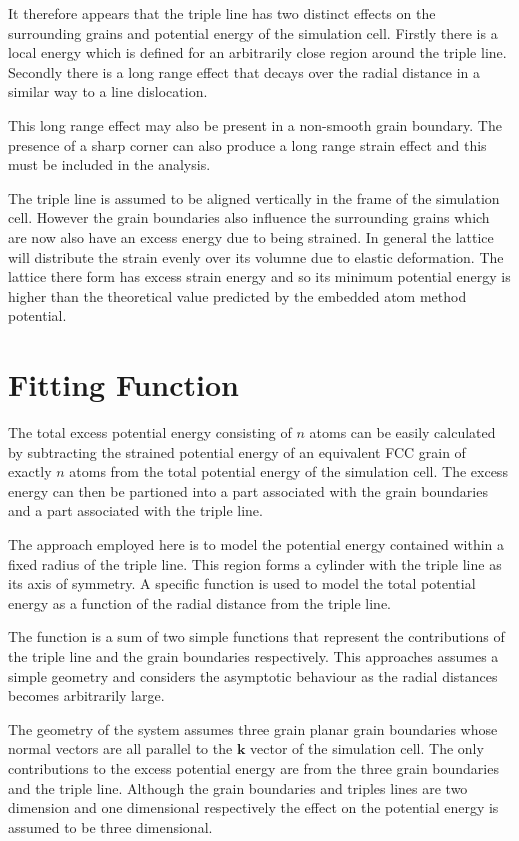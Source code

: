 \documentclass[12pt,a4paper]{book}
\begin{document}
It therefore appears that the triple line has two distinct effects on the surrounding grains and potential energy of the simulation cell. Firstly there is a local energy which is defined for an arbitrarily close region around the triple line. Secondly there is a long range effect that decays over the radial distance in a similar way to a line dislocation.

This long range effect may also be present in a non-smooth grain boundary. The presence of a sharp corner can also produce a long range strain effect and this must be included in the analysis.

The triple line is assumed to be aligned vertically in the frame of the simulation cell. However the grain boundaries also influence the surrounding grains which are now also have an excess energy due to being strained. In general the lattice will distribute the strain evenly over its volumne due to elastic deformation. The lattice there form has excess strain energy and so its minimum  potential energy is higher than the theoretical value predicted by the embedded atom method potential.

\section{Fitting Function}

The total excess potential energy consisting of $n$ atoms can be easily calculated by subtracting the strained potential energy of an equivalent FCC grain of exactly $n$ atoms from the total potential energy of the simulation cell. The excess energy can then be partioned into a part associated with the grain boundaries and a part associated with the triple line.

The approach employed here is to model the potential energy contained within a fixed radius of the triple line. This region forms a cylinder with the triple line as its axis of symmetry. A specific function is used to model the total potential energy as a function of the radial distance from the triple line. 

The function is a sum of two simple functions that represent the contributions of the triple line and the grain boundaries respectively. This approaches assumes a simple geometry and considers the asymptotic behaviour as the radial distances becomes arbitrarily large.

The geometry of the system assumes three grain planar grain boundaries whose normal vectors are all parallel to the $\mathbf{k}$ vector of the simulation cell. The only contributions to the excess potential energy are from the three grain boundaries and the triple line. Although the grain boundaries and triples lines are two dimension and one dimensional respectively the effect on the potential energy is assumed to be three dimensional.
\end{document}
